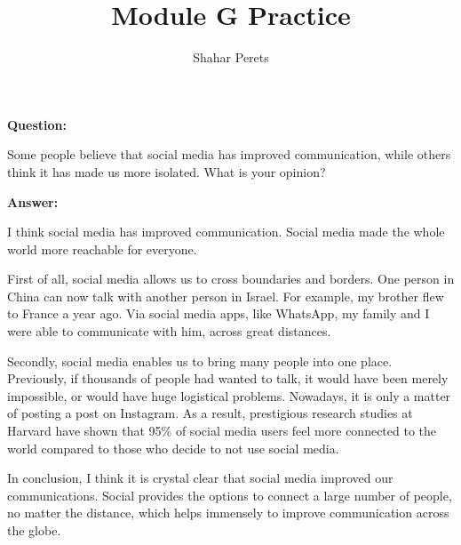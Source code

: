 \documentclass[]{../../../tex/classes/styledArticle}
\author{Shahar Perets}
\title{Module G Practice}
\begin{document}
	\maketitle
	
	\large
	\textbf{Question:}
	
	Some people believe that social media has improved communication, while others think it has made us more isolated. What is your opinion?
	
	\textbf{Answer: }
	
	I think social media has improved communication. Social media made the whole world more reachable for everyone. 
	
	First of all, social media allows us to cross boundaries and borders. One person in China can now talk with another person in Israel. For example, my brother flew to France a year ago. Via social media apps, like WhatsApp, my family and I were able to communicate with him, across great distances. 
	
	Secondly, social media enables us to bring many people into one place. Previously, if thousands of people had wanted to talk, it would have been merely impossible, or would have huge logistical problems. Nowadays, it is only a matter of posting a post on Instagram. As a result, prestigious research studies at Harvard have shown that 95\% of social media users feel more connected to the world compared to those who decide to not use social media. 
	
	In conclusion, I think it is crystal clear that social media improved our communications. Social provides the options to connect a large number of people, no matter the distance, which helps immensely to improve communication across the globe. 
	
	
\end{document}
